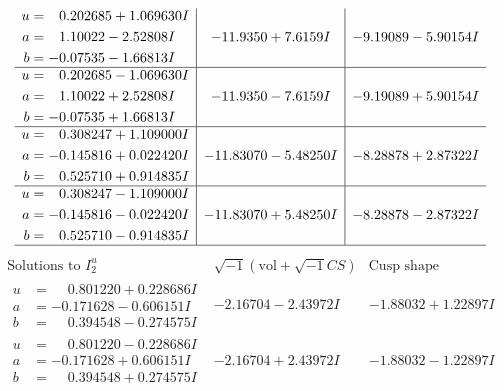 \documentclass[1p]{elsarticle_modified}
\theoremstyle{definition}
\newcommand{\I}{\sqrt{-1}}
\begin{document}
$$\begin{array}{c|c|c}
\begin{aligned}
u &= \phantom{-}0.202685 + 1.069630 I \\
a &= \phantom{-}1.10022 - 2.52808 I \\
b &= -0.07535 - 1.66813 I\end{aligned}
 & -11.9350 + 7.6159 I & -9.19089 - 5.90154 I \\ \hline\begin{aligned}
u &= \phantom{-}0.202685 - 1.069630 I \\
a &= \phantom{-}1.10022 + 2.52808 I \\
b &= -0.07535 + 1.66813 I\end{aligned}
 & -11.9350 - 7.6159 I & -9.19089 + 5.90154 I \\ \hline\begin{aligned}
u &= \phantom{-}0.308247 + 1.109000 I \\
a &= -0.145816 + 0.022420 I \\
b &= \phantom{-}0.525710 + 0.914835 I\end{aligned}
 & -11.83070 - 5.48250 I & -8.28878 + 2.87322 I \\ \hline\begin{aligned}
u &= \phantom{-}0.308247 - 1.109000 I \\
a &= -0.145816 - 0.022420 I \\
b &= \phantom{-}0.525710 - 0.914835 I\end{aligned}
 & -11.83070 + 5.48250 I & -8.28878 - 2.87322 I\\
 \hline 
 \end{array}$$\newpage$$\begin{array}{c|c|c}  
\text{Solutions to }I^u_{2}& \I (\text{vol} + \sqrt{-1}CS) & \text{Cusp shape}\\
 \hline 
\begin{aligned}
u &= \phantom{-}0.801220 + 0.228686 I \\
a &= -0.171628 - 0.606151 I \\
b &= \phantom{-}0.394548 - 0.274575 I\end{aligned}
 & -2.16704 - 2.43972 I & -1.88032 + 1.22897 I \\ \hline\begin{aligned}
u &= \phantom{-}0.801220 - 0.228686 I \\
a &= -0.171628 + 0.606151 I \\
b &= \phantom{-}0.394548 + 0.274575 I\end{aligned}
 & -2.16704 + 2.43972 I & -1.88032 - 1.22897 I \\ \hline\begin{aligned}

\end{aligned}
\end{array}$$
\end{document}

